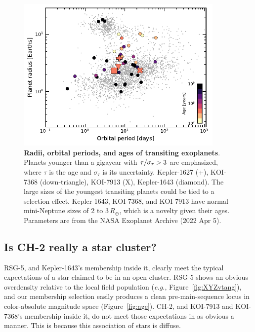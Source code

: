 \documentclass[12pt,twocolumn,linenumbers]{aastex63}
\begin{document}
\begin{figure}[!t]
	\begin{center}
		\leavevmode
		\includegraphics[width=0.9\textwidth]{f4.pdf}
	\end{center}
	\vspace{-0.7cm}
	\caption{
		{\bf Radii, orbital periods, and ages of transiting exoplanets}.
    Planets younger than a gigayear with ${\rm \tau}/\sigma_{\tau} >
    3$ are emphasized, where $\tau$ is the age and $\sigma_{\tau}$ is
    its uncertainty. Kepler-1627 (+), KOI-7368 (down-triangle),
    KOI-7913 (X), Kepler-1643 (diamond).  The large sizes of the
    youngest transiting planets could be tied to a selection effect.
    Kepler-1643, KOI-7368, and KOI-7913 have normal mini-Neptune sizes
    of 2 to 3\,$R_\oplus$, which is a novelty given their ages.
    Parameters are from the NASA Exoplanet Archive (2022 Apr 5).
		\label{fig:rp_period_age}
	}
\end{figure}


\subsection{Is CH-2 really a star cluster?}

RSG-5, and Kepler-1643's membership inside it, clearly meet the
typical expectations of a star claimed to be in an open cluster.
RSG-5 shows an obvious overdensity relative to the local field
population ({\it e.g.}, Figure~\ref{fig:XYZvtang}), and our membership
selection easily produces a clean pre-main-sequence locus in 
color-absolute magnitude space (Figure~\ref{fig:age}).
CH-2, and KOI-7913 and KOI-7368's membership inside it, do not meet
those expectations in as obvious a manner.  This is because this
association of stars is diffuse.
\end{document}
